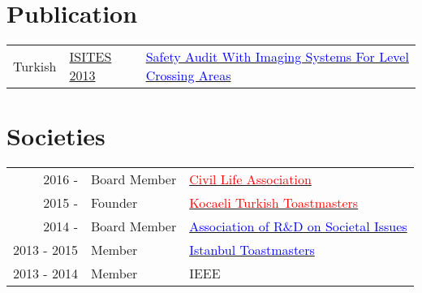 \documentclass[]{deedy-resume-openfont}
\begin{document}
\begin{minipage}[t]{0.66\textwidth}
\sectionsep


\section{Publication}
\begin{tabular}{rll}
Turkish         & \href{http://www.isites.info/PastConferences/ISITES2013/}{ISITES 2013}  & \href{http://www.isites.info/PastConferences/ISITES2013/}{\textcolor{blue}{Safety Audit With Imaging Systems For Level Crossing Areas}}  \\

\end{tabular}
\sectionsep


\section{Societies}

\begin{tabular}{rll}
2016 -      & Board Member    & \href{http://siyamder.org/}{\textcolor{red}{Civil Life Association}} \\
2015 -      & Founder    & \href{http://kocaeliturkcetoastmasters.org/}{\textcolor{red}{Kocaeli Turkish Toastmasters}} \\
2014 -      & Board Member    & \href{http://toplumsalarge.org/}{\textcolor{blue}{Association of R\&D on Societal Issues}} \\
2013 - 2015     & Member    & \href{http://istanbultoastmasters.org/}{\textcolor{blue}{Istanbul Toastmasters}} \\
2013 - 2014    & Member    & IEEE \\
\end{tabular}
\sectionsep

\end{minipage}
\end{document}
